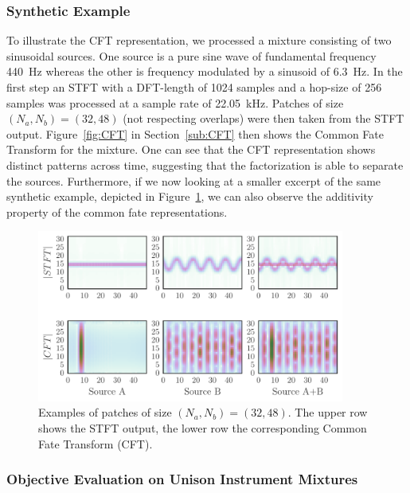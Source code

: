 \subsubsection{Synthetic Example}
\label{sub:Synthentic_Examples}

To illustrate the CFT representation, we processed a mixture consisting of two sinusoidal sources. One source is a pure sine wave of fundamental frequency 440~Hz whereas the other is frequency modulated by a sinusoid of 6.3~Hz. In the first step an STFT with a DFT-length of 1024 samples and a hop-size of 256 samples was processed at a sample rate of 22.05~kHz. Patches of size $(N_a, N_b) = (32, 48)$ (not respecting overlaps) were then taken from the STFT output. Figure~\ref{fig:CFT} in Section~\ref{sub:CFT} then shows the Common Fate Transform for the mixture. One can see that the CFT representation shows distinct patterns across time, suggesting that the factorization is able to separate the sources. 
Furthermore, if we now looking at a smaller excerpt of the same synthetic example, depicted in Figure~\ref{fig:gridplot}, we can also observe the additivity property of the common fate representations.

\begin{figure}[!h]
\centering
		\includegraphics[width=0.9\textwidth]{Chapters/06_Separation_Unknown/figures/gridplot.pdf}
\caption{Examples of patches of size $(N_a, N_b) = (32, 48)$. The upper row shows the STFT output, the lower row the corresponding Common Fate Transform (CFT).}
\label{fig:gridplot}
\end{figure}

\subsubsection{Objective Evaluation on Unison Instrument Mixtures}

